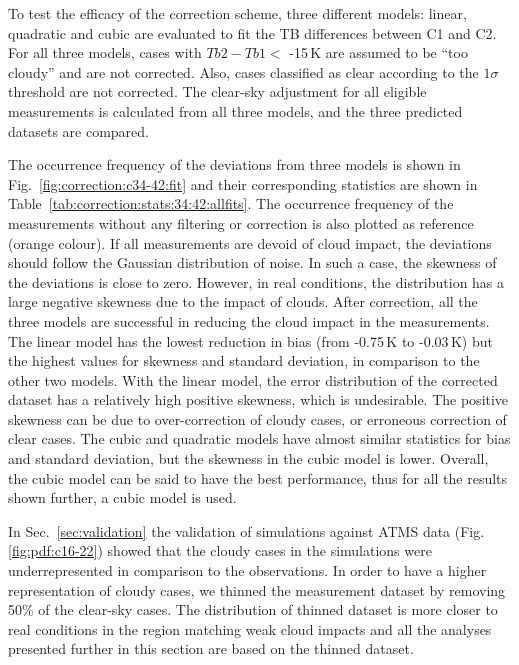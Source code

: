 \documentclass[12pt]{article}
\begin{document}
To test the efficacy of the correction scheme, three different models: linear,
quadratic and cubic are evaluated to fit the TB differences between C1 and C2.
For all three models, cases with $Tb2-Tb1 < $ -15\,K are assumed to be ``too
cloudy'' and are not corrected. Also, cases classified as clear according to
the $1\sigma$ threshold are not corrected. The clear-sky adjustment for all
eligible measurements is calculated from all three models, and the three
predicted datasets are compared.

The occurrence frequency of the deviations from three models is shown in
Fig.~\ref{fig:correction:c34-42:fit} and their corresponding statistics are shown in Table~\ref{tab:correction:stats:34:42:allfits}. The occurrence frequency of the
measurements without any filtering or correction is also plotted as reference
(orange colour). If all measurements are devoid of cloud impact, the
deviations should follow the Gaussian distribution of noise. In such a case, the skewness of the deviations is close to zero.  However, in real conditions, the distribution has a large negative skewness due to the impact of clouds. After correction, all the three models are successful in reducing the cloud impact in the
measurements. The linear model has the lowest reduction in bias (from  -0.75\,K to -0.03\,K) but the highest values for skewness and standard deviation, in comparison to the other two models.  With the linear model, the error distribution of the corrected dataset has a relatively high positive skewness, which is undesirable. The positive skewness can be due to over-correction of cloudy cases, or erroneous correction of clear cases. The cubic  and quadratic models have almost similar statistics for bias and standard deviation, but the skewness in the cubic model is lower. Overall, the cubic model can be said to have the best performance, thus for all the results shown further, a cubic model is used.

In Sec.~\ref{sec:validation} the validation of simulations against ATMS data
(Fig.\ref{fig:pdf:c16-22}) showed that the cloudy cases in the simulations were
underrepresented in comparison to the observations. In order to have a higher
representation of cloudy cases, we thinned the measurement dataset by removing
50\% of the clear-sky cases. The distribution of thinned dataset is more closer
to real conditions in the region matching weak cloud impacts and all the
analyses presented further in this section are based on the thinned dataset.
\end{document}
